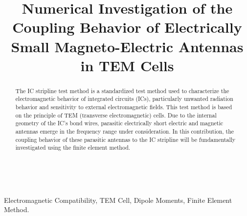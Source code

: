 \documentclass[conference]{IEEEtran}
\begin{document}
\title{Numerical Investigation of the Coupling Behavior of Electrically Small Magneto-Electric Antennas in TEM Cells}\\
\author{
\and
{}
\and
{}
}

\maketitle

\begin{abstract}
The IC stripline test method is a standardized test method used to characterize the electromagnetic behavior of integrated circuits (ICs), particularly unwanted radiation behavior and sensitivity to external electromagnetic fields. This test method is based on the principle of TEM (transverse electromagnetic) cells. Due to the internal geometry of the IC's bond wires, parasitic electrically short electric and magnetic antennas emerge in the frequency range under consideration. In this contribution, the coupling behavior of these parasitic antennas to the IC stripline will be fundamentally investigated using the finite element method.
\end{abstract}

\begin{IEEEkeywords}
Electromagnetic Compatibility, TEM Cell, Dipole Moments, Finite Element Method.
\end{IEEEkeywords}
\end{document}
